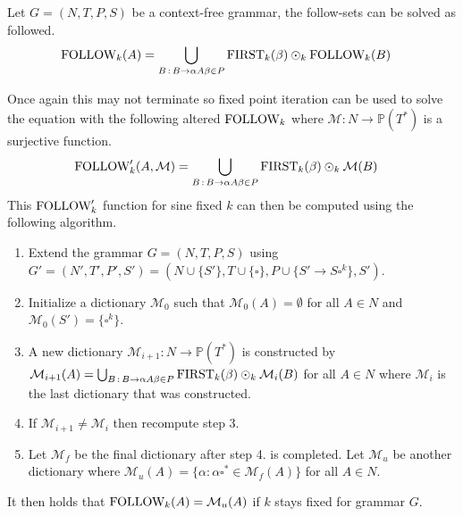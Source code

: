 \begin{algorithm}
    \label{algorithm:follow}
    Let $G = (N, T, P, S)$ be a context-free grammar, the follow-sets can be solved as followed.
    \begin{align*}
        \text{FOLLOW}_k(A) &= \bigcup_{B \, : \, B \to \alpha A \beta \in P} \text{FIRST}_k(\beta) \odot_k \text{FOLLOW}_k(B)
    \end{align*}
\end{algorithm}
\noindent Once again this may not terminate so fixed point iteration can be used to solve the equation with the following altered $\text{FOLLOW}_k$ where $\mathcal{M}: N \to \mathbb{P}(T^*)$ is a surjective function.
\begin{align*}
    \text{FOLLOW}'_k(A, \mathcal{M}) &= \bigcup_{B \,: \, B \to \alpha A \beta \in P} \text{FIRST}_k(\beta) \odot_k \mathcal{M}(B)
\end{align*}
This $\text{FOLLOW}'_k$ function for sine fixed $k$ can then be computed using the following algorithm.
\begin{enumerate}
    \item Extend the grammar $G = (N, T, P, S)$ using $G' = (N', T', P', S') = (N \cup \{S'\}, T \cup \{\square\}, P \cup \{S' \to S \square^k\}, S')$.
    \item Initialize a dictionary $\mathcal{M}_0$ such that $\mathcal{M}_0(A) = \emptyset$ for all $A \in N$ and $\mathcal{M}_0(S') = \{\square^k\}$.
    \item A new dictionary $\mathcal{M}_{i+1}: N \to \mathbb{P}(T^*)$ is constructed by $\mathcal{M}_{i+1}(A) = \bigcup_{B \,: \, B \to  \alpha A \beta \in P} \text{FIRST}_k(\beta) \odot_k \mathcal{M}_{i}(B)$ for all $A \in N$ where $\mathcal{M}_{i}$ is the last dictionary that was constructed.
    \item If $\mathcal{M}_{i+1} \neq \mathcal{M}_{i}$ then recompute step 3.
    \item Let $\mathcal{M}_f$ be the final dictionary after step 4. is completed. Let $\mathcal{M}_u$ be another dictionary where $\mathcal{M}_u(A) = \{\alpha : \alpha \square^* \in \mathcal{M}_f(A)\}$ for all $A \in N$. 
\end{enumerate}
It then holds that $\text{FOLLOW}_k(A) = \mathcal{M}_u(A)$ if $k$ stays fixed for grammar $G$.